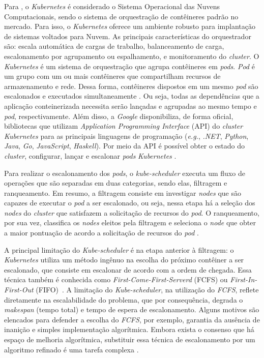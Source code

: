 Para , o \textit{Kubernetes} é considerado o Sistema Operacional das Nuvens Computacionais, sendo o sistema de orquestração de contêineres padrão no mercado. Para isso, o \textit{Kubernetes} oferece um ambiente robusto para implantação de sistemas voltados para Nuvem. As principais características do orquestrador são: escala automática de cargas de trabalho, balanceamento de carga, escalonamento por agrupamento ou espalhamento, e monitoramento do \textit{cluster}.
%
O \textit{Kubernetes} é um sistema de orquestração que agrupa contêineres em \textit{pods}. \textit{Pod} é um grupo com um ou mais contêineres que compartilham recursos de armazenamento e rede. Dessa forma, contêineres dispostos em um mesmo \textit{pod} são escalonados e executados simultaneamente \cite{Google}. Ou seja, todas as dependências que a aplicação conteinerizada necessita serão lançadas e agrupadas ao mesmo tempo e \textit{pod}, respectivamente. Além disso, a \textit{Google} disponibiliza, de forma oficial, bibliotecas que utilizam \textit{Application Programming Interface} (API) do \textit{cluster} \textit{Kubernetes}  para as principais linguagens de programação (\textit{e.g.}, \textit{.NET}, \textit{Python}, \textit{Java}, \textit{Go}, \textit{JavaScript}, \textit{Haskell}). Por meio da API é possível obter o estado do \textit{cluster}, configurar, lançar e escalonar \textit{pods} \textit{Kubernetes} \cite{KubernetesAPI}.

Para realizar o escalonamento dos \textit{pods}, o \textit{kube-scheduler} executa um fluxo de operações que são separadas em duas categorias, sendo elas, filtragem e ranqueamento. Em resumo, a filtragem consiste em investigar \textit{nodes} que são capazes de executar o \textit{pod} a ser escalonado, ou seja, nessa etapa há a seleção dos \textit{nodes} do \textit{cluster} que satisfazem a solicitação de recursos do \textit{pod}. O ranqueamento, por sua vez, classifica os \textit{nodes} eleitos pela filtragem e seleciona o \textit{node} que obter a maior pontuação de acordo a solicitação de recursos do \textit{pod} \cite{Kubescheduler}.

A principal limitação do \textit{Kube-scheduler} é na etapa anterior à filtragem: o \textit{Kubernetes} utiliza um método ingênuo na escolha do próximo contêiner a ser escalonado, que consiste em escalonar de acordo com a ordem de chegada. Essa técnica também é conhecida como \textit{First-Come-First-Serverd} (FCFS) ou \textit{First-In-First-Out} (FIFO)~\cite{Ye2007}. A limitação do \textit{Kube-scheduler}, na utilização do \textit{FCFS}, reflete diretamente na escalabilidade do problema, que por consequência, degrada o \textit{makespan} (tempo total) e tempo de espera de escalonamento. Alguns motivos são elencados para defender a escolha do \textit{FCFS}, por exemplo, garantia da ausência de inanição e simples implementação algorítmica. Embora exista o consenso que há espaço de melhoria algorítmica, substituir essa técnica de escalonamento por um algoritmo refinado é uma tarefa complexa \cite{CarastanSantos2019}.

